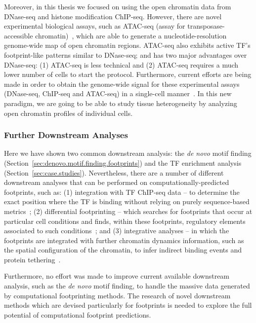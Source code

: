 Moreover, in this thesis we focused on using the open chromatin data from DNase-seq and histone modification ChIP-seq. However, there are novel experimental biological assays, such as ATAC-seq (assay for transposase-accessible chromatin)~\citep{buenrostro2013}, which are able to generate a nucleotide-resolution genome-wide map of open chromatin regions. ATAC-seq also exhibits active TF's footprint-like patterns similar to DNase-seq; and has two major advantages over DNase-seq: (1) ATAC-seq is less technical and (2) ATAC-seq requires a much lower number of cells to start the protocol. Furthermore, current efforts are being made in order to obtain the genome-wide signal for these experimental assays (DNase-seq, ChIP-seq and ATAC-seq) in a single-cell manner~\citep{buenrostro2015}. In this new paradigm, we are going to be able to study tissue heterogeneity by analyzing open chromatin profiles of individual cells.

\subsubsection{Further Downstream Analyses}

Here we have shown two common downstream analysis: the \emph{de novo} motif finding (Section~\ref{sec:denovo.motif.finding.footprints}) and the TF enrichment analysis (Section~\ref{sec:case.studies}). Nevertheless, there are a number of different downstream analyses that can be performed on computationally-predicted footprints, such as: (1) integration with TF ChIP-seq data -- to determine the exact position where the TF is binding without relying on purely sequence-based metrics~\citep{pique2011}; (2) differential footprinting -- which searches for footprints that occur at particular cell conditions and finds, within these footprints, regulatory elements associated to such conditions~\citep{he2012}; and (3) integrative analyses -- in which the footprints are integrated with further chromatin dynamics information, such as the spatial configuration of the chromatin, to infer indirect binding events and protein tethering~\citep{thurman2012}.

Furthermore, no effort was made to improve current available downstream analysis, such as the \emph{de novo} motif finding, to handle the massive data generated by computational footprinting methods. The research of novel downstream methods which are devised particularly for footprints is needed to explore the full potential of computational footprint predictions.


